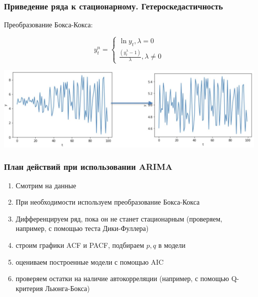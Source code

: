 \documentclass[fullscreen=true, bookmarks=true, hyperref={pdfencoding=unicode}]{beamer}
\begin{document}
\begin{frame}
  \frametitle{Приведение ряда к стационарному. Гетероскедастичность}

  Преобразование Бокса-Кокса:

  $$ y_t^n =
    \begin{cases}
    \ln y_t,  \lambda = 0 \\
    \frac{(y_t^\lambda - 1)}{\lambda}, \lambda \neq 0
    \end{cases}
  $$

  \vspace{0.5cm}
  \begin{center}
    \includegraphics[keepaspectratio,
                     width=.85\paperwidth]{heteroscedasticity.jpg}
  \end{center}

\end{frame}


\begin{frame}
  \frametitle{План действий при использовании ARIMA}
  \begin{enumerate}
    \item Смотрим на данные
    \item При необходимости используем преобразование Бокса-Кокса
    \item Дифференцируем ряд, пока он не станет стационарным (проверяем, например, с помощью теста Дики-Фуллера)
    \item строим графики ACF и PACF, подбираем $p, q$ в модели
    \item оцениваем построенные модели с помощью AIC
    \item проверяем остатки на наличие автокорреляции (например, с помощью Q-критерия Льюнга-Бокса)
  \end{enumerate}
\end{frame}
\end{document}
